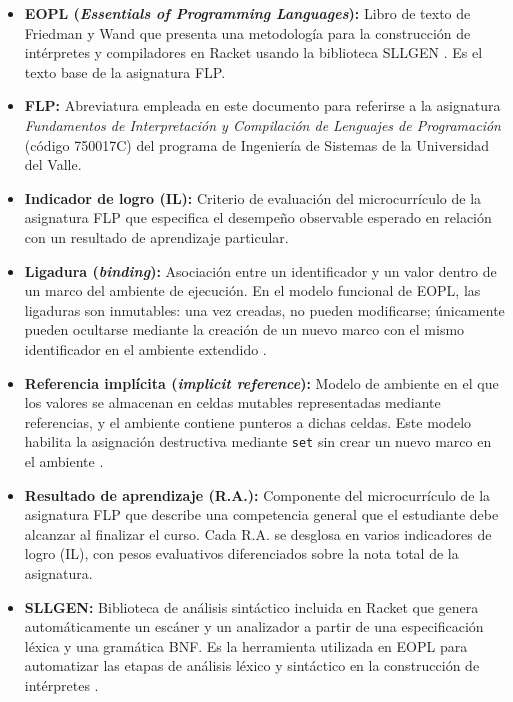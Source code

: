 \begin{itemize}
    \item \textbf{EOPL (\textit{Essentials of Programming Languages}):}
    Libro de texto de Friedman y Wand que presenta una metodología para la construcción de intérpretes y compiladores en Racket usando la biblioteca SLLGEN \cite{Friedman2008EPL}. Es el texto base de la asignatura FLP.

    \item \textbf{FLP:}
    Abreviatura empleada en este documento para referirse a la asignatura \textit{Fundamentos de Interpretación y Compilación de Lenguajes de Programación} (código 750017C) del programa de Ingeniería de Sistemas de la Universidad del Valle.

    \item \textbf{Indicador de logro (IL):}
    Criterio de evaluación del microcurrículo de la asignatura FLP que especifica el desempeño observable esperado en relación con un resultado de aprendizaje particular.

    \item \textbf{Ligadura (\textit{binding}):}
    Asociación entre un identificador y un valor dentro de un marco del ambiente de ejecución. En el modelo funcional de EOPL, las ligaduras son inmutables: una vez creadas, no pueden modificarse; únicamente pueden ocultarse mediante la creación de un nuevo marco con el mismo identificador en el ambiente extendido \cite{Friedman2008EPL}.

    \item \textbf{Referencia implícita (\textit{implicit reference}):}
    Modelo de ambiente en el que los valores se almacenan en celdas mutables representadas mediante referencias, y el ambiente contiene punteros a dichas celdas. Este modelo habilita la asignación destructiva mediante \texttt{set} sin crear un nuevo marco en el ambiente \cite{Friedman2008EPL}.

    \item \textbf{Resultado de aprendizaje (R.A.):}
    Componente del microcurrículo de la asignatura FLP que describe una competencia general que el estudiante debe alcanzar al finalizar el curso. Cada R.A. se desglosa en varios indicadores de logro (IL), con pesos evaluativos diferenciados sobre la nota total de la asignatura.

    \item \textbf{SLLGEN:}
    Biblioteca de análisis sintáctico incluida en Racket que genera automáticamente un escáner y un analizador a partir de una especificación léxica y una gramática BNF. Es la herramienta utilizada en EOPL para automatizar las etapas de análisis léxico y sintáctico en la construcción de intérpretes \cite{Friedman2008EPL}.

\end{itemize}
